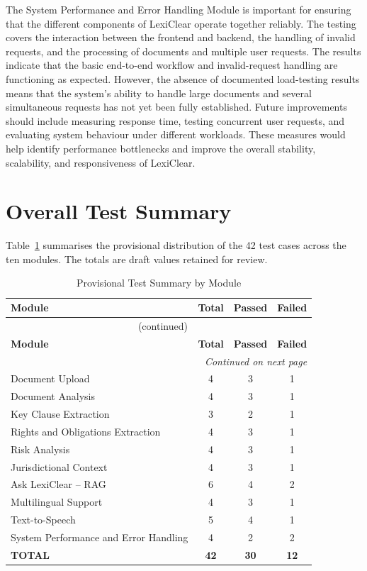 \documentclass[12pt,a4paper,oneside]{report}
\begin{document}
The System Performance and Error Handling Module is important for ensuring that the different components of LexiClear operate together reliably. The testing covers the interaction between the frontend and backend, the handling of invalid requests, and the processing of documents and multiple user requests. The results indicate that the basic end-to-end workflow and invalid-request handling are functioning as expected. However, the absence of documented load-testing results means that the system's ability to handle large documents and several simultaneous requests has not yet been fully established. Future improvements should include measuring response time, testing concurrent user requests, and evaluating system behaviour under different workloads. These measures would help identify performance bottlenecks and improve the overall stability, scalability, and responsiveness of LexiClear.


\section{Overall Test Summary}
Table~\ref{tab:test-summary} summarises the provisional distribution of the 42 test cases across the ten modules. The totals are draft values retained for review.

{\footnotesize
\setlength{\tabcolsep}{6pt}
\renewcommand{\arraystretch}{1.2}
\begin{longtable}{|l|c|c|c|}
\caption{Provisional Test Summary by Module}\label{tab:test-summary}\\
\hline
\textbf{Module} & \textbf{Total} & \textbf{Passed} & \textbf{Failed}\\
\hline
\endfirsthead
\multicolumn{4}{c}{\tablename~\thetable{} (continued)}\\
\hline
\textbf{Module} & \textbf{Total} & \textbf{Passed} & \textbf{Failed}\\
\hline
\endhead
\hline
\multicolumn{4}{r}{\emph{Continued on next page}}\\
\endfoot
\hline
\endlastfoot
Document Upload & 4 & 3 & 1\\
\hline
Document Analysis & 4 & 3 & 1\\
\hline
Key Clause Extraction & 3 & 2 & 1\\
\hline
Rights and Obligations Extraction & 4 & 3 & 1\\
\hline
Risk Analysis & 4 & 3 & 1\\
\hline
Jurisdictional Context & 4 & 3 & 1\\
\hline
Ask LexiClear -- RAG & 6 & 4 & 2\\
\hline
Multilingual Support & 4 & 3 & 1\\
\hline
Text-to-Speech & 5 & 4 & 1\\
\hline
System Performance and Error Handling & 4 & 2 & 2\\
\hline
\textbf{TOTAL} & \textbf{42} & \textbf{30} & \textbf{12}\\
\end{longtable}
}
\end{document}
